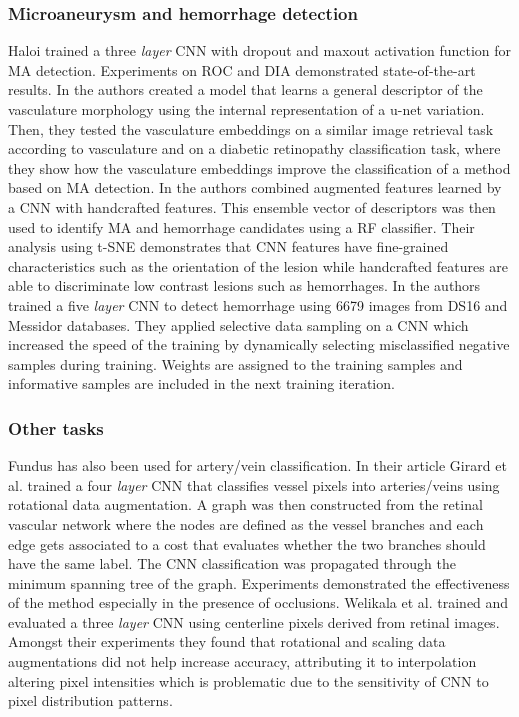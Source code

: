 \documentclass[journal]{IEEEtran}
\begin{document}
\subsubsection{Microaneurysm and hemorrhage detection}
Haloi\cite{haloi2015improved} trained a three \textit{layer} CNN with dropout and maxout activation function for MA detection.
Experiments on ROC and DIA demonstrated state-of-the-art results.
In\cite{giancardo2017representation} the authors created a model that learns a general descriptor of the vasculature morphology using the internal representation of a u-net variation.
Then, they tested the vasculature embeddings on a similar image retrieval task according to vasculature and on a diabetic retinopathy classification task, where they show how the vasculature embeddings improve the classification of a method based on MA detection.
In\cite{orlando2018ensemble} the authors combined augmented features learned by a CNN with handcrafted features.
This ensemble vector of descriptors was then used to identify MA and hemorrhage candidates using a RF classifier.
Their analysis using t-SNE demonstrates that CNN features have fine-grained characteristics such as the orientation of the lesion while handcrafted features are able to discriminate low contrast lesions such as hemorrhages.
In\cite{van2016fast} the authors trained a five \textit{layer} CNN to detect hemorrhage using 6679 images from DS16 and Messidor databases.
They applied selective data sampling on a CNN which increased the speed of the training by dynamically selecting misclassified negative samples during training.
Weights are assigned to the training samples and informative samples are included in the next training iteration.

\subsubsection{Other tasks}
Fundus has also been used for artery/vein classification.
In their article Girard et al.\cite{girard2017artery} trained a four \textit{layer} CNN that classifies vessel pixels into arteries/veins using rotational data augmentation.
A graph was then constructed from the retinal vascular network where the nodes are defined as the vessel branches and each edge gets associated to a cost that evaluates whether the two branches should have the same label.
The CNN classification was propagated through the minimum spanning tree of the graph.
Experiments demonstrated the effectiveness of the method especially in the presence of occlusions.
Welikala et al.\cite{welikala2017automated} trained and evaluated a three \textit{layer} CNN using centerline pixels derived from retinal images.
Amongst their experiments they found that rotational and scaling data augmentations did not help increase accuracy, attributing it to interpolation altering pixel intensities which is problematic due to the sensitivity of CNN to pixel distribution patterns.
\end{document}
